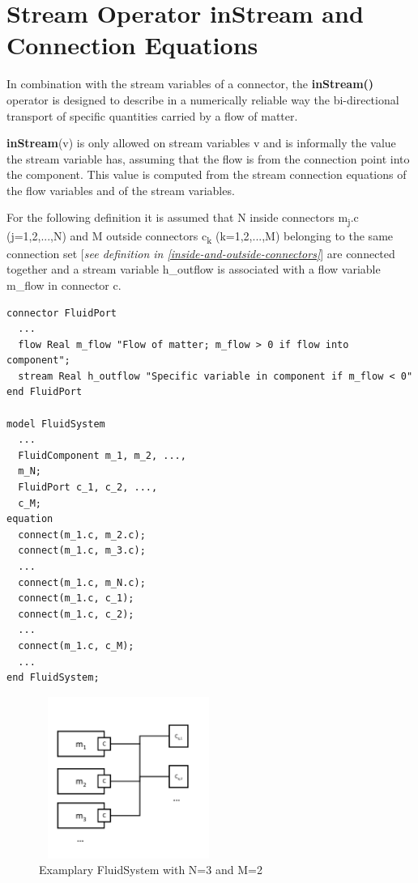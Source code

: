 \documentclass[10pt,a4paper]{report}
\def\doublelabel#1{\label{#1}}
\begin{document}
\section{Stream Operator inStream and Connection Equations}\doublelabel{stream-operator-instream-and-connection-equations}

In combination with the stream variables of a connector, the
\textbf{inStream()} operator is designed to describe in a numerically
reliable way the bi-directional transport of specific quantities carried
by a flow of matter.

\textbf{inStream}(v) is only allowed on stream variables v and is
informally the value the stream variable has, assuming that the flow is
from the connection point into the component. This value is computed
from the stream connection equations of the flow variables and of the
stream variables.

For the following definition it is assumed that N inside connectors
m\textsubscript{j}.c (j=1,2,...,N) and M outside connectors
c\textsubscript{k} (k=1,2,...,M) belonging to the same connection set
{[}\emph{see definition in \ref{inside-and-outside-connectors}}{]} are connected
together and a stream variable h\_outflow is associated with a flow
variable m\_flow in connector c.

\begin{lstlisting}[language=modelica]
connector FluidPort
  ...
  flow Real m_flow "Flow of matter; m_flow > 0 if flow into component";
  stream Real h_outflow "Specific variable in component if m_flow < 0"
end FluidPort

model FluidSystem
  ...
  FluidComponent m_1, m_2, ...,
  m_N;
  FluidPort c_1, c_2, ...,
  c_M;
equation
  connect(m_1.c, m_2.c);
  connect(m_1.c, m_3.c);
  ...
  connect(m_1.c, m_N.c);
  connect(m_1.c, c_1);
  connect(m_1.c, c_2);
  ...
  connect(m_1.c, c_M);
  ...
end FluidSystem;
\end{lstlisting}
\begin{figure}
\caption{Examplary FluidSystem with N=3 and M=2}
\includegraphics[width=2.3in,height=2.08125in]{media/fluidsystem}
\end{figure} 
\end{document}
